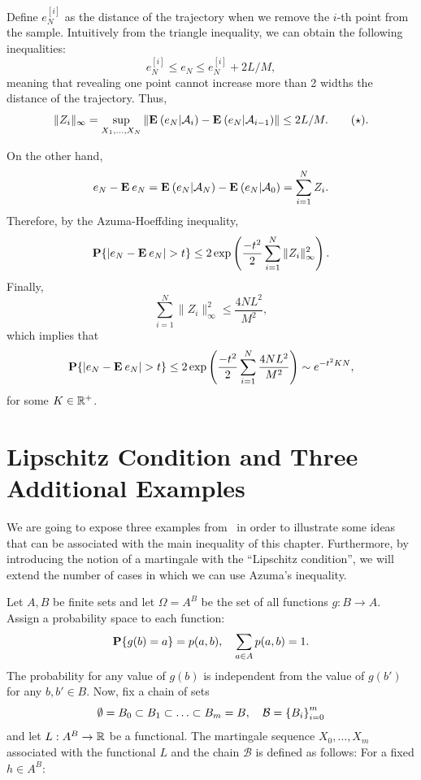 Define $e_N^{[i]}$ as the distance of the trajectory when we remove the $i$-th point from the sample.
Intuitively from the triangle inequality, we can obtain the following inequalities:
\[ e_N^{[i]} \leq e_N \leq e_N^{[i]} + 2 L/M, \]
meaning that revealing one point cannot increase more than 2 widths the distance of the trajectory. Thus,
\[ \|Z_i\|_\infty = \sup_{X_1,\ldots, X_N} \|\E (e_N | \A_i) - \E (e_N | \A_{i-1})\| \leq 2L/M. \tag*{$ (\star)$}.\]

On the other hand,
\[  e_N - \E e_N = \E (e_N | \A_N) - \E (e_N | \A_{0}) = \sum_{i = 1}^{N} Z_i.\]
Therefore, by the Azuma-Hoeffding inequality,
\[ \P \{ |e_N - \E e_N| > t \} \leq 2\exp\left(\frac{-t^2}{2}\sum_{i = 1}^{N} \|Z_i\|_{\infty}^2 \right). \] 
Finally,
\[ \sum_{i = 1}^{N} \|Z_i\|_{\infty}^2 \leq \frac{4NL^2}{M^2}, \]
which implies that
\[\P \{ |e_N - \E e_N| > t \} \leq 2\exp\left(\frac{-t^2}{2}\sum_{i = 1}^{N} \frac{4NL^2}{M^2} \right) \sim e^{-t^{2} K N}, \] 
for some $K\in \R^+$.

\section{Lipschitz Condition and Three Additional Examples}

We are going to expose three examples from~\cite{alon2016probabilistic} in order to illustrate some ideas that can be associated with the main inequality of this chapter. Furthermore, by introducing the notion of a martingale with the ``Lipschitz condition'', we will extend the number of cases in which we can use Azuma's inequality.

\vspace*{1em}

Let $A,B$ be finite sets and let $\Omega = A^B$ be the set of all functions $g: B\to A$. Assign a probability space to each function:
\[ \P\{g(b) = a\} = p(a,b),\hspace*{1em} \sum_{a\in A} p(a,b) = 1. \]
The probability for any value of $g(b)$ is independent from the value of $g(b')$ for any $b,b' \in B$. Now, fix a chain of sets 
\[ \emptyset = B_0 \subset B_1 \subset \ldots \subset B_m = B,\hspace*{1em} \mathcal{B} = {\{B_i\}}_{i = 0}^m \]
and let $L: A^B \to \R$ be a functional. The martingale sequence $X_0,\ldots, X_m$ associated with the functional $L$ and the chain $\mathcal{B}$ is defined as follows: For a fixed $h \in A^B$:

